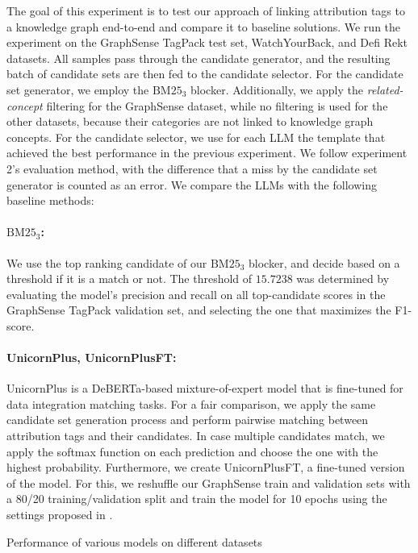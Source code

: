 The goal of this experiment is to test our approach of linking attribution tags to a knowledge graph end-to-end and compare it to baseline solutions. We run the experiment on the GraphSense TagPack test set, WatchYourBack, and Defi Rekt datasets. All samples pass through the candidate generator, and the resulting batch of candidate sets are then fed to the candidate selector. For the candidate set generator, we employ the $\text{BM25}_3$ blocker. Additionally, we apply the \emph{related-concept} filtering for the GraphSense dataset, while no filtering is used for the other datasets, because their categories are not linked to knowledge graph concepts. For the candidate selector, we use for each LLM the template that achieved the best performance in the previous experiment. We follow experiment 2's evaluation method, with the difference that a miss by the candidate set generator is counted as an error. We compare the LLMs with the following baseline methods:

\paragraph{$\text{BM25}_3$:} We use the top ranking candidate of our $\text{BM25}_3$ blocker, and decide based on a threshold if it is a match or not. The threshold of $\mathit{15.7238}$ was determined by evaluating the model’s precision and recall on all top-candidate scores in the GraphSense TagPack validation set, and selecting the one that maximizes the F1-score.

\paragraph{UnicornPlus, UnicornPlusFT:} UnicornPlus\cite{Tu2023} is a DeBERTa-based mixture-of-expert model that is fine-tuned for data integration matching tasks. For a fair comparison, we apply the same candidate set generation process and perform pairwise matching between attribution tags and their candidates. In case multiple candidates match, we apply the softmax function on each prediction and choose the one with the highest probability. Furthermore, we create UnicornPlusFT, a fine-tuned version of the model. For this, we reshuffle our GraphSense train and validation sets with a 80/20 training/validation split and train the model for 10 epochs using the settings proposed in \cite{Tu2023}.

\begin{table}
    \centering
    \caption{Performance of various models on different datasets}
    
    \label{tab:e2e_performance}
\end{table}


